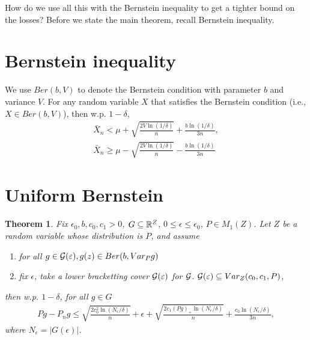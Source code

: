 \documentclass[twoside]{article}
\newcounter{lecnum}
\newtheorem{theorem}{Theorem}[lecnum]
\begin{document}
How do we use all this with the Bernstein inequality to get a tighter bound on the losses?  Before we state the main theorem, recall Bernstein inequality.

\section{Bernstein inequality}
We use $Ber(b, V)$ to denote the Bernstein condition with parameter $b$ and variance $V$.  For any random variable $X$ that satisfies the Bernstein condition (i.e., $X \in Ber(b, V)$), then w.p. $1-\delta$, 
\begin{align}
    \bar X_n < \mu + \sqrt{\frac{2V \ln(1/\delta)}{n}} + \frac{b \ln(1/\delta)}{3n}, \\
    \bar X_n \geq \mu - \sqrt{\frac{2V \ln(1/\delta)}{n}} - \frac{b \ln(1/\delta)}{3n}
\end{align}

\section{Uniform Bernstein}
\begin{theorem}
    Fix $\epsilon_0, b, c_0, c_1 > 0$, $G \subseteq \mathbb{R}^Z$, $0 \leq \epsilon \leq \epsilon_0$, $P \in M_1(Z)$.  Let $Z$ be a random variable whose distribution is $P$, and assume
\begin{enumerate}
    \item for all $g \in \mathcal{G}(\varepsilon), g(z) \in Ber(b, Var_{P}g)$
    \item fix $\epsilon$, take a lower bracketting cover $\mathcal{G}(\varepsilon)$ for $\mathcal{G}$.  $\mathcal{G}(\varepsilon) \subseteq Var_Z(c_0, c_1, P)$,
\end{enumerate}
then w.p. $1- \delta$, for all $g \in G$
\begin{align}
    Pg - P_n g \leq \sqrt{\frac{2 c_0^2 \ln(N_{\epsilon}/\delta)}{n}} + \epsilon + \sqrt{\frac{2 c_1 (Pg)_+ \ln(N_\epsilon / \delta)}{n}} + \frac{c_0 \ln(N_\epsilon/\delta)}{3n},
\end{align}
where $N_\epsilon = |G(\epsilon)|$.
\end{theorem}
\end{document}
